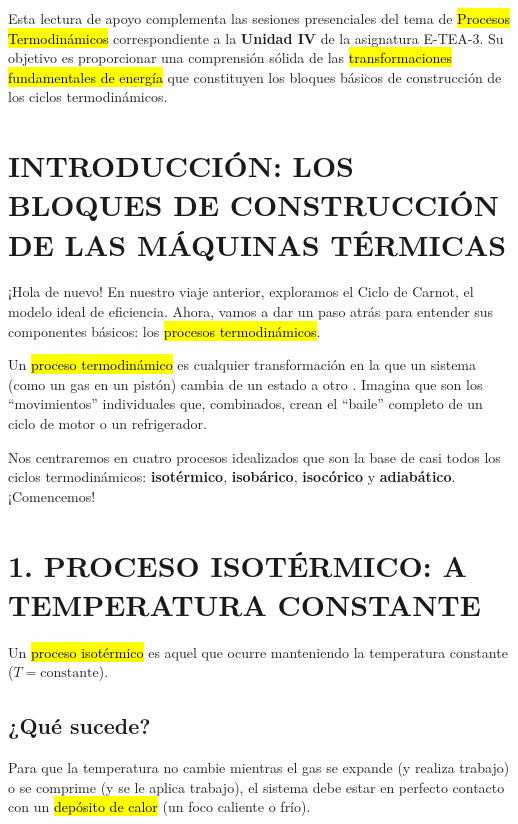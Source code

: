 \documentclass{article}
\begin{document}

Esta lectura de apoyo complementa las sesiones presenciales del tema de \hl{Procesos Termodinámicos} correspondiente a la \textbf{Unidad IV} de la asignatura E-TEA-3. Su objetivo es proporcionar una comprensión sólida de las \hl{transformaciones fundamentales de energía} que constituyen los bloques básicos de construcción de los ciclos termodinámicos.

\vspace{5mm}

\section*{INTRODUCCIÓN: LOS BLOQUES DE CONSTRUCCIÓN DE LAS MÁQUINAS TÉRMICAS}

¡Hola de nuevo! En nuestro viaje anterior, exploramos el Ciclo de Carnot, el modelo ideal de eficiencia. Ahora, vamos a dar un paso atrás para entender sus componentes básicos: los \hl{procesos termodinámicos}.

Un \hl{proceso termodinámico} es cualquier transformación en la que un sistema (como un gas en un pistón) cambia de un estado a otro \parencite{cengel2002}. Imagina que son los ``movimientos'' individuales que, combinados, crean el ``baile'' completo de un ciclo de motor o un refrigerador.

Nos centraremos en cuatro procesos idealizados que son la base de casi todos los ciclos termodinámicos: \textbf{isotérmico}, \textbf{isobárico}, \textbf{isocórico} y \textbf{adiabático}. ¡Comencemos!

\vspace{5mm}

\section*{1. PROCESO ISOTÉRMICO: A TEMPERATURA CONSTANTE}

Un \hl{proceso isotérmico} es aquel que ocurre manteniendo la temperatura constante ($T = \text{constante}$).

\subsection*{¿Qué sucede?}

Para que la temperatura no cambie mientras el gas se expande (y realiza trabajo) o se comprime (y se le aplica trabajo), el sistema debe estar en perfecto contacto con un \hl{depósito de calor} (un foco caliente o frío).
\end{document}

